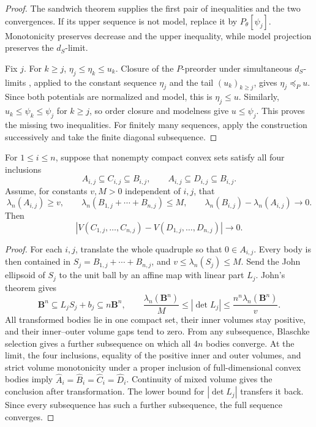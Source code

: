\begin{proof}
The sandwich theorem \cite[Proposition~6.2.3]{XiaBook} supplies the first
pair of inequalities and the two convergences.  If its upper sequence is
not model, replace it by \(P_\theta[\psi_j]\).  Monotonicity preserves
decrease and the upper inequality, while model projection preserves the
\(d_S\)-limit.

Fix \(j\).  For \(k\geq j\),
\(\eta_j\leq\eta_k\leq u_k\).  Closure of the \(P\)-preorder under
simultaneous \(d_S\)-limits \cite[Proposition~6.2.5]{XiaBook}, applied to
the constant sequence \(\eta_j\) and the tail \((u_k)_{k\geq j}\), gives
\(\eta_j\preceq_Pu\).  Since both potentials are normalized and model,
this is \(\eta_j\leq u\).  Similarly,
\(u_k\leq\psi_k\leq\psi_j\) for \(k\geq j\), so order closure and modelness
give \(u\leq\psi_j\).  This proves the missing two inequalities.  For
finitely many sequences, apply the construction successively and take the
finite diagonal subsequence.
\end{proof}

\begin{lemma}\label{lem:ok-mvob-uniform-sandwich}
For \(1\leq i\leq n\), suppose that nonempty compact convex sets satisfy
all four inclusions
\[
 A_{i,j}\subseteq C_{i,j}\subseteq B_{i,j},\qquad
 A_{i,j}\subseteq D_{i,j}\subseteq B_{i,j}.
\tag{55.38}\label{eq:ok-mvob-convex-sandwich}
\]
Assume, for constants \(v,M>0\) independent of \(i,j\), that
\[
 \lambda_n(A_{i,j})\geq v,\qquad
 \lambda_n(B_{1,j}+\cdots+B_{n,j})\leq M,\qquad
 \lambda_n(B_{i,j})-\lambda_n(A_{i,j})\longrightarrow0.
\]
Then
\[
 \left|V(C_{1,j},\ldots,C_{n,j})
       -V(D_{1,j},\ldots,D_{n,j})\right|\longrightarrow0.
\]
\end{lemma}

\begin{proof}
For each \(i,j\), translate the whole quadruple so that
\(0\in A_{i,j}\).  Every body is then contained in
\(S_j=B_{1,j}+\cdots+B_{n,j}\), and
\(v\leq\lambda_n(S_j)\leq M\).  Send the John ellipsoid of \(S_j\) to the
unit ball by an affine map with linear part \(L_j\).  John's theorem
\cite[Theorem~10.12.2]{Sch14} gives
\[
 \mathbf B^n\subseteq L_jS_j+b_j\subseteq n\mathbf B^n,\qquad
 \frac{\lambda_n(\mathbf B^n)}{M}\leq|\det L_j|
 \leq\frac{n^n\lambda_n(\mathbf B^n)}{v}.
\]
All transformed bodies lie in one compact set, their inner volumes stay
positive, and their inner--outer volume gaps tend to zero.  From any
subsequence, Blaschke selection \cite[Theorem~1.8.7]{Sch14} gives a further
subsequence on which all
\(4n\) bodies converge.  At the limit, the four inclusions, equality of the
positive inner and outer volumes, and strict volume monotonicity under a
proper inclusion of full-dimensional convex bodies imply
\(\widehat A_i=\widehat B_i=\widehat C_i=\widehat D_i\).  Continuity of
mixed volume gives the conclusion after transformation.  The lower bound
for \(|\det L_j|\) transfers it back.  Since every subsequence has such a
further subsequence, the full sequence converges.
\end{proof}


